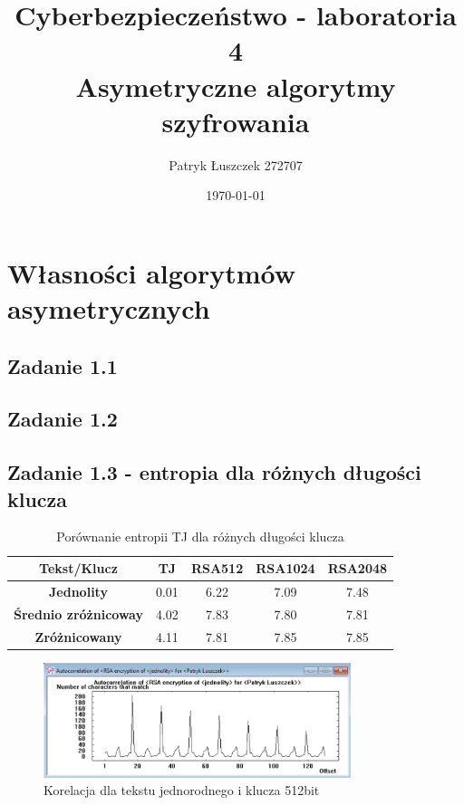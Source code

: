 \documentclass{article}
\title{%
  Cyberbezpieczeństwo - laboratoria 4 \\
  \large Asymetryczne algorytmy szyfrowania}
\author{Patryk Łuszczek 272707}
\date{\today}
\begin{document}
\maketitle
\newpage
\tableofcontents
\newpage

\section{Własności algorytmów asymetrycznych}
\subsection{Zadanie 1.1}
\subsection{Zadanie 1.2}
\subsection{Zadanie 1.3 - entropia dla różnych długości klucza}

\begin{table}[H]
    \centering
    \caption{Porównanie entropii TJ dla różnych długości klucza}
    \begin{tabular}{|c|c|c|c|c|}
        \hline
        \textbf{Tekst/Klucz}         & \textbf{TJ} & \textbf{RSA512} & \textbf{RSA1024} & \textbf{RSA2048} \\ \hline
        \textbf{Jednolity}           & 0.01        & 6.22            & 7.09             & 7.48             \\ \hline
        \textbf{Średnio zróżnicoway} & 4.02        & 7.83            & 7.80             & 7.81             \\ \hline
        \textbf{Zróżnicowany}        & 4.11        & 7.81            & 7.85             & 7.85             \\ \hline
    \end{tabular}
\end{table}

\begin{figure}[H]
    \centering
    \includegraphics[width=0.8\textwidth]{korelacja_jednorodny_512.png}
    \caption{Korelacja dla tekstu jednorodnego i klucza 512bit}
\end{figure}
\end{document}
